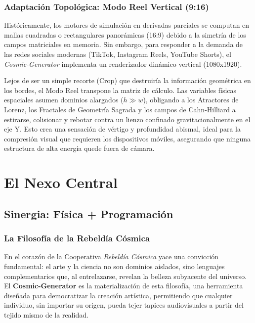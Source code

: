 \documentclass[12pt, openany]{book}
\begin{document}
\section{Adaptación Topológica: Modo Reel Vertical (9:16)}
Históricamente, los motores de simulación en derivadas parciales se computan en mallas cuadradas o rectangulares panorámicas (16:9) debido a la simetría de los campos matriciales en memoria. Sin embargo, para responder a la demanda de las redes sociales modernas (TikTok, Instagram Reels, YouTube Shorts), el \textit{Cosmic-Generator} implementa un renderizador dinámico vertical (1080x1920).

Lejos de ser un simple recorte (Crop) que destruiría la información geométrica en los bordes, el Modo Reel transpone la matriz de cálculo. Las variables físicas espaciales asumen dominios alargados ($h \gg w$), obligando a los Atractores de Lorenz, los Fractales de Geometría Sagrada y los campos de Cahn-Hilliard a estirarse, colisionar y rebotar contra un lienzo confinado gravitacionalmente en el eje Y. Esto crea una sensación de vértigo y profundidad abismal, ideal para la compresión visual que requieren los dispositivos móviles, asegurando que ninguna estructura de alta energía quede fuera de cámara.

\part{El Nexo Central}

\chapter*{Sinergia: Física + Programación}

\section*{La Filosofía de la Rebeldía Cósmica}
En el corazón de la Cooperativa \textit{Rebeldía Cósmica} yace una convicción fundamental: el arte y la ciencia no son dominios aislados, sino lenguajes complementarios que, al entrelazarse, revelan la belleza subyacente del universo. El \textbf{Cosmic-Generator} es la materialización de esta filosofía, una herramienta diseñada para democratizar la creación artística, permitiendo que cualquier individuo, sin importar su origen, pueda tejer tapices audiovisuales a partir del tejido mismo de la realidad.
\end{document}
